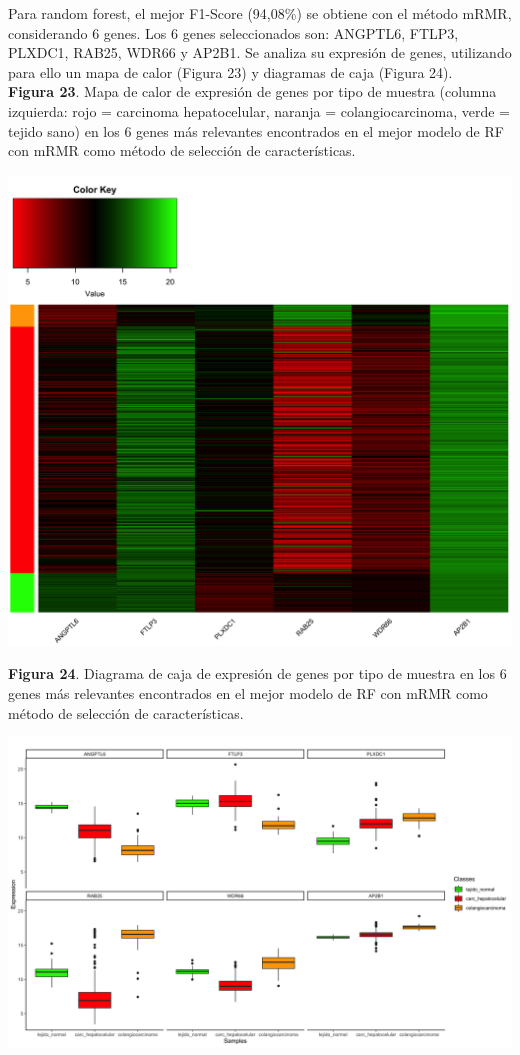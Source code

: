 Para random forest, el mejor F1-Score (94,08\%) se obtiene con el método mRMR, considerando 6 genes. Los 6 genes seleccionados son: ANGPTL6, FTLP3, PLXDC1, RAB25, WDR66
y AP2B1. Se analiza su expresión de genes, utilizando para ello un mapa de calor (Figura 23) y diagramas de caja (Figura 24).\\

\textbf{Figura 23}. Mapa de calor de expresión de genes por tipo de muestra (columna izquierda: rojo = carcinoma hepatocelular, naranja = colangiocarcinoma, verde = tejido sano) en los 6 genes más relevantes encontrados en el mejor modelo de RF con mRMR como método de selección de características.
\begin{center}
	\includegraphics[width=1\textwidth]{figuras/23_higado_multiclase_23_rf_heatmap_mejor_metodo.png} 
\end{center}

\newpage
\textbf{Figura 24}. Diagrama de caja de expresión de genes por tipo de muestra en los 6 genes más relevantes encontrados en el mejor modelo de RF con mRMR como método de selección de características.
\begin{center}
	\includegraphics[width=1\textwidth]{figuras/24_higado_multiclase_24_rf_boxplots_mejor_metodo.png} 
\end{center}

